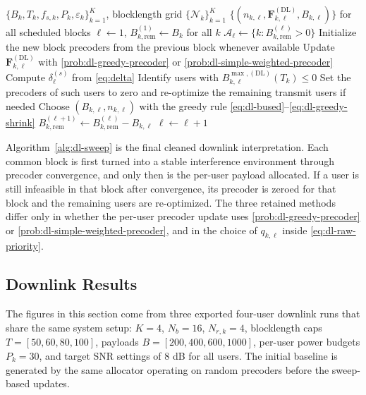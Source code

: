 \documentclass[11pt]{article}
\newcommand{\Aset}{\mathcal{A}}
\newcommand{\Nset}{\mathcal{N}}
\newcommand{\F}{\mathbf{F}}
\newcommand{\DL}{\mathrm{DL}}
\begin{document}
\begin{algorithm}[ht]
\caption{Downlink Sweep Scheduler}
\label{alg:dl-sweep}
\begin{algorithmic}[1]
\Require $\{B_k,T_k,f_{s,k},P_k,\varepsilon_k\}_{k=1}^K$, blocklength grid $\{\Nset_k\}_{k=1}^K$
\Ensure $\{(n_{k,\ell},\F_{k,\ell}^{(\DL)},B_{k,\ell})\}$ for all scheduled blocks
\State $\ell \gets 1$, $B_{k,\mathrm{rem}}^{(1)} \gets B_k$ for all $k$
    \State $\Aset_\ell \gets \{k : B_{k,\mathrm{rem}}^{(\ell)} > 0\}$
    \State Initialize the new block precoders from the previous block whenever available
    \Repeat
        \For{$k \in \Aset_\ell$}
            \State Update $\F_{k,\ell}^{(\DL)}$ with \eqref{prob:dl-greedy-precoder} or \eqref{prob:dl-simple-weighted-precoder}
        \EndFor
        \State Compute $\delta_\ell^{(s)}$ from \eqref{eq:delta}
        \State Identify users with $B_{k,\ell}^{\max,(\DL)}(T_k) \le 0$
        \State Set the precoders of such users to zero and re-optimize the remaining transmit users if needed
    \For{$k \in \Aset_\ell$}
        \State Choose $(B_{k,\ell},n_{k,\ell})$ with the greedy rule \eqref{eq:dl-bused}--\eqref{eq:dl-greedy-shrink}
        \State $B_{k,\mathrm{rem}}^{(\ell+1)} \gets B_{k,\mathrm{rem}}^{(\ell)} - B_{k,\ell}$
    \EndFor
    \State $\ell \gets \ell + 1$
\EndWhile
\end{algorithmic}
\end{algorithm}

Algorithm~\ref{alg:dl-sweep} is the final cleaned downlink interpretation. Each common block is first turned into a stable interference environment through precoder convergence, and only then is the per-user payload allocated. If a user is still infeasible in that block after convergence, its precoder is zeroed for that block and the remaining users are re-optimized. The three retained methods differ only in whether the per-user precoder update uses \eqref{prob:dl-greedy-precoder} or \eqref{prob:dl-simple-weighted-precoder}, and in the choice of $q_{k,\ell}$ inside \eqref{eq:dl-raw-priority}.

\subsection{Downlink Results}
The figures in this section come from three exported four-user downlink runs that share the same system setup: $K=4$, $N_b=16$, $N_{r,k}=4$, blocklength caps $T = [50,60,80,100]$, payloads $B = [200,400,600,1000]$, per-user power budgets $P_k = 30$, and target SNR settings of $8$ dB for all users. The initial baseline is generated by the same allocator operating on random precoders before the sweep-based updates.
\end{document}
